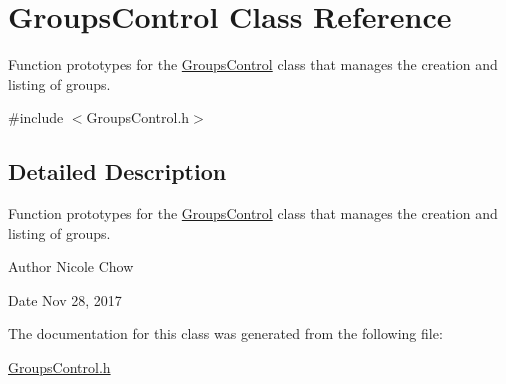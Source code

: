 \hypertarget{classGroupsControl}{}\section{Groups\+Control Class Reference}
\label{classGroupsControl}


Function prototypes for the \hyperlink{classGroupsControl}{Groups\+Control} class that manages the creation and listing of groups.  




{\ttfamily \#include $<$Groups\+Control.\+h$>$}



\subsection{Detailed Description}
Function prototypes for the \hyperlink{classGroupsControl}{Groups\+Control} class that manages the creation and listing of groups. 

\begin{DoxyAuthor}{Author}
Nicole Chow 
\end{DoxyAuthor}
\begin{DoxyDate}{Date}
Nov 28, 2017 
\end{DoxyDate}


The documentation for this class was generated from the following file\+:\begin{DoxyCompactItemize}
\item 
\hyperlink{GroupsControl_8h}{Groups\+Control.\+h}\end{DoxyCompactItemize}
